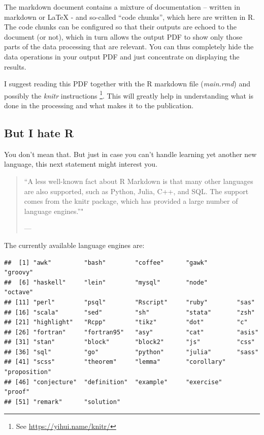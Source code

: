 \documentclass[10pt,]{article}
\newenvironment{Shaded}{\begin{snugshade}}{\end{snugshade}}
\newcommand{\KeywordTok}[1]{\textcolor[rgb]{0.13,0.29,0.53}{\textbf{#1}}}
\newcommand{\NormalTok}[1]{#1}
\newcommand{\OperatorTok}[1]{\textcolor[rgb]{0.81,0.36,0.00}{\textbf{#1}}}
\let\rmarkdownfootnote\footnote%
\def\footnote{\protect\rmarkdownfootnote}
\begin{document}
The markdown document contains a mixture of documentation -- written in markdown or LaTeX - and so-called ``code chunks'', which here are written in R. The code chunks can be configured so that their outputs are echoed to the document (or not), which in turn allows the output PDF to show only those parts of the data processing that are relevant. You can thus completely hide the data operations in your output PDF and just concentrate on displaying the results.

I suggest reading this PDF together with the R markdown file (\emph{main.rmd}) and possibly the \emph{knitr} instructions \footnote{See \url{https://yihui.name/knitr/}}. This will greatly help in understanding what is done in the processing and what makes it to the publication.

\hypertarget{but-i-hate-r}{%
\subsection{But I hate R}\label{but-i-hate-r}}

You don't mean that. But just in case you can't handle learning yet another new language, this next statement might interest you.

\begin{quote}
``A less well-known fact about R Markdown is that many other languages are also supported, such as Python, Julia, C++, and SQL. The support comes from the knitr package, which has provided a large number of language engines.''"

--- \citet{R-Markdown-Guide}
\end{quote}

The currently available language engines are:

\begin{Shaded}
\end{Shaded}

\begin{verbatim}
##  [1] "awk"         "bash"        "coffee"      "gawk"        "groovy"     
##  [6] "haskell"     "lein"        "mysql"       "node"        "octave"     
## [11] "perl"        "psql"        "Rscript"     "ruby"        "sas"        
## [16] "scala"       "sed"         "sh"          "stata"       "zsh"        
## [21] "highlight"   "Rcpp"        "tikz"        "dot"         "c"          
## [26] "fortran"     "fortran95"   "asy"         "cat"         "asis"       
## [31] "stan"        "block"       "block2"      "js"          "css"        
## [36] "sql"         "go"          "python"      "julia"       "sass"       
## [41] "scss"        "theorem"     "lemma"       "corollary"   "proposition"
## [46] "conjecture"  "definition"  "example"     "exercise"    "proof"      
## [51] "remark"      "solution"
\end{verbatim}
\end{document}
